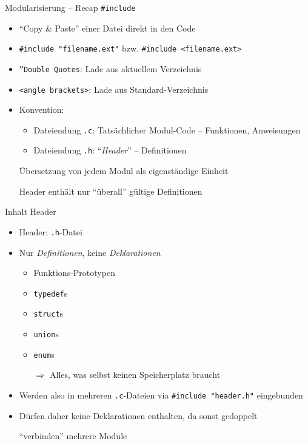 
\begin{frame}[fragile]{Modularisierung -- Recap \texttt{\#include}}
%
\begin{itemize}
\item \enquote{Copy \& Paste} einer Datei direkt in den Code
\item \texttt{#include "filename.ext"} bzw. \texttt{#include <filename.ext>}
\item \texttt{''Double Quotes}: Lade aus aktuellem Verzeichnis
\item \texttt{<angle brackets>}: Lade aus Standard-Verzeichnis
\item Konvention:
	\begin{itemize}
	\item Dateiendung \texttt{.c}: Tatsächlicher Modul-Code -- Funktionen, Anweisungen
	\item Dateiendung \texttt{.h}: \enquote{\emph{Header}} -- Definitionen
	\end{itemize}
\item[\Thus] Übersetzung von jedem Modul als eigenständige Einheit
\item[\Thus] Header enthält nur \enquote{überall} gültige Definitionen
\end{itemize}
%
\end{frame}


\begin{frame}[fragile]{Inhalt Header}
%
\begin{itemize}
\item Header: \texttt{.h}-Datei
\item Nur \emph{Definitionen}, keine \emph{Deklarationen}
	\begin{itemize}
	\item Funktions-Prototypen
	\item \texttt{typedef}s
	\item \texttt{struct}s
	\item \texttt{union}s
	\item \texttt{enum}s
	\item[$\Rightarrow$] Alles, was selbst keinen Speicherplatz braucht
	\end{itemize}
\item Werden also in mehreren \texttt{.c}-Dateien via \texttt{#include "header.h"} eingebunden
\item Dürfen daher keine Deklarationen enthalten, da sonst gedoppelt
\item[\Thus] \enquote{verbinden} mehrere Module
\end{itemize}
%
\end{frame}

